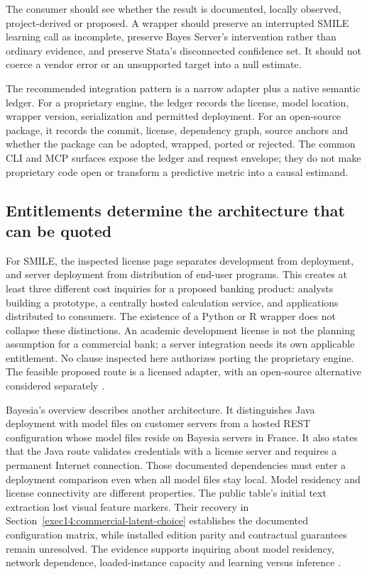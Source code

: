 The consumer should see whether the result is documented, locally observed,
project-derived or proposed. A wrapper should preserve an interrupted SMILE
learning call as incomplete, preserve Bayes Server's intervention rather than
ordinary evidence, and preserve Stata's disconnected confidence set. It should
not coerce a vendor error or an unsupported target into a null estimate.

The recommended integration pattern is a narrow adapter plus a native semantic
ledger. For a proprietary engine, the ledger records the license, model
location, wrapper version, serialization and permitted deployment. For an
open-source package, it records the commit, license, dependency graph, source
anchors and whether the package can be adopted, wrapped, ported or rejected.
The common CLI and MCP surfaces expose the ledger and request envelope; they do
not make proprietary code open or transform a predictive metric into a causal
estimand.

\subsection{Entitlements determine the architecture that can be quoted}
\label{exec17:s8-editions}

For SMILE, the inspected license page separates development from deployment,
and server deployment from distribution of end-user programs. This creates
at least three different cost inquiries for a proposed banking product:
analysts building a prototype, a centrally hosted calculation service, and
applications distributed to consumers. The existence of a Python or R wrapper
does not collapse these distinctions. An academic development license is not
the planning assumption for a commercial bank; a server integration needs
its own applicable entitlement. No clause inspected here authorizes porting
the proprietary engine. The feasible proposed route is a licensed adapter,
with an open-source alternative considered separately
\citep{exec13_smile_license}.

Bayesia's overview describes another architecture. It distinguishes Java
deployment with model files on customer servers from a hosted REST
configuration whose model files reside on Bayesia servers in France. It also
states that the Java route validates credentials with a license server and
requires a permanent Internet connection. Those documented dependencies must
enter a deployment comparison even when all model files stay local. Model
residency and license connectivity are different properties. The public table's
initial text extraction lost visual feature markers. Their recovery in
Section~\ref{exec14:commercial-latent-choice} establishes the documented
configuration matrix, while installed edition parity and contractual guarantees
remain unresolved. The evidence supports inquiring about model residency,
network dependence, loaded-instance capacity and learning versus inference \citep{exec13_bayesia_api}.

